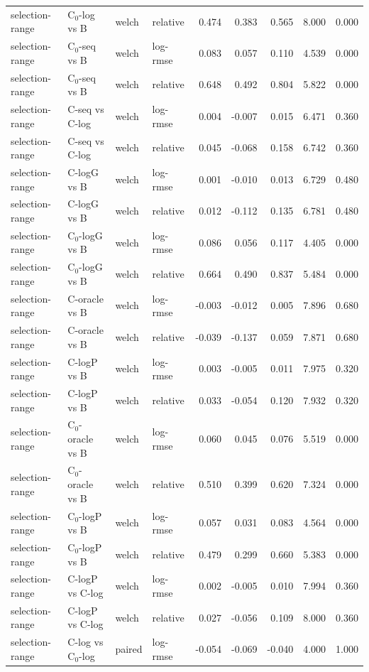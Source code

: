 \begin{longtable}{llllrrrrr}
selection-range & C$_0$-log vs B & welch & relative & 0.474 & 0.383 & 0.565 & 8.000 & 0.000 \\
selection-range & C$_0$-seq vs B & welch & log-rmse & 0.083 & 0.057 & 0.110 & 4.539 & 0.000 \\
selection-range & C$_0$-seq vs B & welch & relative & 0.648 & 0.492 & 0.804 & 5.822 & 0.000 \\
selection-range & C-seq vs C-log & welch & log-rmse & 0.004 & -0.007 & 0.015 & 6.471 & 0.360 \\
selection-range & C-seq vs C-log & welch & relative & 0.045 & -0.068 & 0.158 & 6.742 & 0.360 \\
selection-range & C-logG vs B & welch & log-rmse & 0.001 & -0.010 & 0.013 & 6.729 & 0.480 \\
selection-range & C-logG vs B & welch & relative & 0.012 & -0.112 & 0.135 & 6.781 & 0.480 \\
selection-range & C$_0$-logG vs B & welch & log-rmse & 0.086 & 0.056 & 0.117 & 4.405 & 0.000 \\
selection-range & C$_0$-logG vs B & welch & relative & 0.664 & 0.490 & 0.837 & 5.484 & 0.000 \\
selection-range & C-oracle vs B & welch & log-rmse & -0.003 & -0.012 & 0.005 & 7.896 & 0.680 \\
selection-range & C-oracle vs B & welch & relative & -0.039 & -0.137 & 0.059 & 7.871 & 0.680 \\
selection-range & C-logP vs B & welch & log-rmse & 0.003 & -0.005 & 0.011 & 7.975 & 0.320 \\
selection-range & C-logP vs B & welch & relative & 0.033 & -0.054 & 0.120 & 7.932 & 0.320 \\
selection-range & C$_0$-oracle vs B & welch & log-rmse & 0.060 & 0.045 & 0.076 & 5.519 & 0.000 \\
selection-range & C$_0$-oracle vs B & welch & relative & 0.510 & 0.399 & 0.620 & 7.324 & 0.000 \\
selection-range & C$_0$-logP vs B & welch & log-rmse & 0.057 & 0.031 & 0.083 & 4.564 & 0.000 \\
selection-range & C$_0$-logP vs B & welch & relative & 0.479 & 0.299 & 0.660 & 5.383 & 0.000 \\
selection-range & C-logP vs C-log & welch & log-rmse & 0.002 & -0.005 & 0.010 & 7.994 & 0.360 \\
selection-range & C-logP vs C-log & welch & relative & 0.027 & -0.056 & 0.109 & 8.000 & 0.360 \\
selection-range & C-log vs C$_0$-log & paired & log-rmse & -0.054 & -0.069 & -0.040 & 4.000 & 1.000 \\

\end{longtable}
